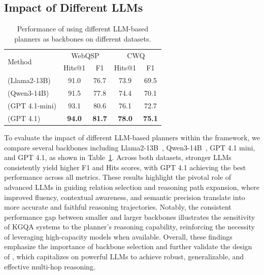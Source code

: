 \subsection{Impact of Different LLMs} 
\begin{table} 
\vspace{-29pt}
\footnotesize
\centering
\tabcolsep=6pt
\begin{tabular}{l|cc|cc}
\toprule
\multirow{2}{*}{Method} & \multicolumn{2}{c}{WebQSP} & \multicolumn{2}{c}{CWQ} \\
 & Hits@1 & F1 & Hits@1 & F1 \\
\midrule
\method{} (Llama2-13B) & 91.0 & 76.7 & 73.9 & 69.5 \\
\method{} (Qwen3-14B) & 91.5 & 77.8 & 74.4 & 70.1 \\
\method{} (GPT 4.1-mini) & 93.1 & 80.6 & 76.1 & 72.7 \\
\method{} (GPT 4.1) & \textbf{94.0} & \textbf{81.7} & \textbf{78.0} & \textbf{75.1} \\
\bottomrule
\end{tabular}
            \caption{Performance of \method{} using different LLM-based planners as backbones on different datasets.}\label{tab:backbone_results}
\end{table}
To evaluate the impact of different LLM-based planners within the \method{} framework, we compare several backbones including Llama2-13B~\citep{roque2025evolution}, Qwen3-14B~\citep{team2024qwen2}, GPT 4.1 mini, and GPT 4.1, as shown in Table~\ref{tab:backbone_results}. Across both datasets, stronger LLMs consistently yield higher F1 and Hits scores, with GPT 4.1 achieving the best performance across all metrics. These results highlight the pivotal role of advanced LLMs in guiding relation selection and reasoning path expansion, where improved fluency, contextual awareness, and semantic precision translate into more accurate and faithful reasoning trajectories. Notably, the consistent performance gap between smaller and larger backbones illustrates the sensitivity of KGQA systems to the planner’s reasoning capability, reinforcing the necessity of leveraging high-capacity models when available. Overall, these findings emphasize the importance of backbone selection and further validate the design of \method{}, which capitalizes on powerful LLMs to achieve robust, generalizable, and effective multi-hop reasoning.


